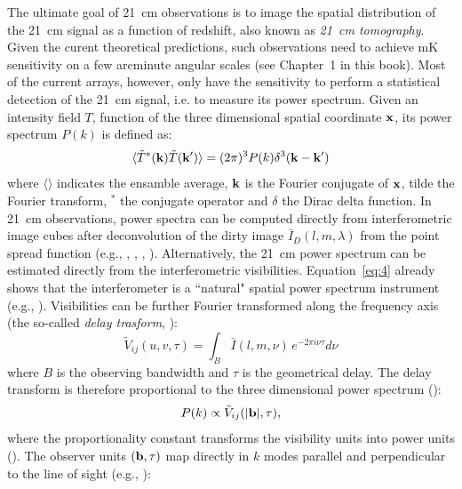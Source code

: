 The ultimate goal of 21~cm observations is to image the spatial distribution of the 21~cm signal as a function of redshift, also known as {\it 21~cm tomography}. Given the curent theoretical predictions, such observations need to achieve mK sensitivity on a few arcminute angular scales (see Chapter~1 in this book). Most of the current arrays, however, only have the sensitivity to perform a statistical detection of the 21~cm signal, i.e. to measure its power spectrum. Given an intensity field $T$, function of the three dimensional spatial coordinate $\bf x$, its power spectrum $P(k)$ is defined as:
\begin{equation}
\langle {\tilde T}^* ({\bf k}) {\tilde T}({\bf k'}) \rangle = (2 \pi)^3 P(k) \delta^3({\bf k} - {\bf k}')
\label{sec_observables_eq1}
\end{equation}
where $\langle \rangle$ indicates the ensamble average, $\bf k$ is the Fourier conjugate of $\bf x$, tilde the Fourier transform, $^*$ the conjugate operator and $\delta$ the Dirac delta function. In 21~cm observations, power spectra can be computed directly from interferometric image cubes after deconvolution of the dirty image ${\bar I}_D (l,m,\lambda)$ from the point spread function (e.g., \cite{pen09}, \cite{harker10}, \cite{beardsley16}, \cite{patil17}). Alternatively, the 21~cm power spectrum can be estimated directly from the interferometric visibilities. Equation~\ref{eq:4} already shows that the interferometer is a ``natural" spatial power spectrum instrument (e.g., \cite{white99}). Visibilities can be further Fourier transformed along the frequency axis (the so-called {\it delay trasform}, \cite{parsons12a}): 
\begin{equation}
{\tilde V}_{ij} (u,v, \tau) = \int_B {\bar I} (l, m, \nu) \, e^{-2 \pi i \nu \tau} d \nu
\label{sec_observables_eq2}
\end{equation}
where $B$ is the observing bandwidth and $\tau$ is the geometrical delay. The delay transform is therefore proportional to the three dimensional power spectrum (\cite{parsons12b}):
\begin{equation}
P(k) \propto {\tilde V}_{ij} (|{\bf b}|, \tau),
\label{sec_observables_eq3}
\end{equation}
where the proportionality constant transforms the visibility units into power units (\cite{parsons12b}). The observer units $({\bf b},\tau)$ map directly in $k$ modes parallel and perpendicular to the line of sight (e.g., \cite{morales04}):
